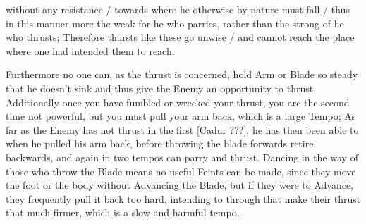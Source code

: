\newpage


\newpage

%

without any resistance / towards where he otherwise by nature must
fall / thus in this manner more the weak for he who parries, rather
than the strong of he who thrusts; Therefore thursts like these go
unwise / and cannot reach the place where one had intended them to reach.

Furthermore no one can, as the thrust is concerned, hold Arm or Blade
so steady that he doesn't sink and thus give the Enemy an opportunity
to thrust. Additionally once you have fumbled or wrecked your thrust,
you are the second time not powerful, but you must pull your arm back,
which is a large Tempo; As far as the Enemy has not thrust in the
first [Cadur ???], he has then been able to when he pulled his arm
back, before throwing the blade forwards retire backwards, and again
in two tempos can parry and thrust. Dancing in the way of those who
throw the Blade means no useful Feints can be made, since they move
the foot or the body without Advancing the Blade, but if they were to
Advance, they frequently pull it back too hard, intending to through
that make their thrust that much firmer, which is a slow and harmful tempo.


